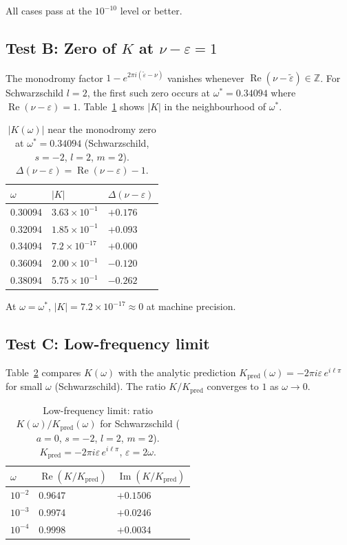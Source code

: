\documentclass[12pt,a4paper]{article}
\newcommand{\eps}{\varepsilon}
\newcommand{\epst}{\tilde{\varepsilon}}
\begin{document}
All cases pass at the $10^{-10}$ level or better.

\subsection{Test B: Zero of \texorpdfstring{$K$}{K} at \texorpdfstring{$\nu - \eps = 1$}{nu-eps=1}}

The monodromy factor $1 - e^{2\pi i(\epst - \nu)}$ vanishes whenever
$\operatorname{Re}(\nu - \epst) \in \mathbb{Z}$.
For Schwarzschild $l=2$, the first such zero occurs at
$\omega^* = 0.34094$ where $\operatorname{Re}(\nu - \varepsilon) = 1$.
Table~\ref{tab:zero} shows $|K|$ in the neighbourhood of $\omega^*$.

\begin{table}[ht]
\centering
\caption{$|K(\omega)|$ near the monodromy zero at $\omega^* = 0.34094$
(Schwarzschild, $s=-2$, $l=2$, $m=2$).
$\Delta(\nu-\varepsilon) = \operatorname{Re}(\nu-\varepsilon) - 1$.}
\label{tab:zero}
\begin{tabular}{lll}
\toprule
$\omega$ & $|K|$ & $\Delta(\nu - \varepsilon)$ \\
\midrule
0.30094 & $3.63 \times 10^{-1}$ & $+0.176$ \\
0.32094 & $1.85 \times 10^{-1}$ & $+0.093$ \\
0.34094 & $7.2 \times 10^{-17}$ & $+0.000$ \\
0.36094 & $2.00 \times 10^{-1}$ & $-0.120$ \\
0.38094 & $5.75 \times 10^{-1}$ & $-0.262$ \\
\bottomrule
\end{tabular}
\end{table}

At $\omega = \omega^*$, $|K| = 7.2 \times 10^{-17} \approx 0$ at machine precision.

\subsection{Test C: Low-frequency limit}

Table~\ref{tab:lowfreq} compares $K(\omega)$ with the analytic prediction
$K_{\mathrm{pred}}(\omega) = -2\pi i \varepsilon\, e^{i\ell\pi}$
for small $\omega$ (Schwarzschild).
The ratio $K/K_{\mathrm{pred}}$ converges to $1$ as $\omega \to 0$.

\begin{table}[ht]
\centering
\caption{Low-frequency limit: ratio $K(\omega)/K_{\mathrm{pred}}(\omega)$
for Schwarzschild ($a=0$, $s=-2$, $l=2$, $m=2$).
$K_{\mathrm{pred}} = -2\pi i\varepsilon\,e^{i\ell\pi}$, $\varepsilon = 2\omega$.}
\label{tab:lowfreq}
\begin{tabular}{lll}
\toprule
$\omega$ & $\operatorname{Re}(K/K_{\mathrm{pred}})$ & $\operatorname{Im}(K/K_{\mathrm{pred}})$ \\
\midrule
$10^{-2}$ & 0.9647 & $+0.1506$ \\
$10^{-3}$ & 0.9974 & $+0.0246$ \\
$10^{-4}$ & 0.9998 & $+0.0034$ \\
\bottomrule
\end{tabular}
\end{table}
\end{document}
